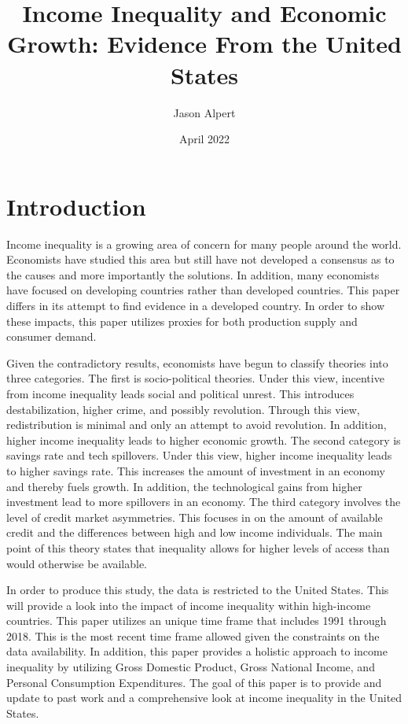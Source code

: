 \documentclass{article}
\title{Income Inequality and Economic Growth: Evidence From the United States}
\author{Jason Alpert }
\date{April 2022}
\begin{document}
\maketitle

\section{Introduction}
\vspace{2mm}

\quad Income inequality is a growing area of concern for many people around the world.  Economists have studied this area but still have not developed a consensus as to the causes and more importantly the solutions.  In addition, many economists have focused on developing countries rather than developed countries.  This paper differs in its attempt to find evidence in a developed country.  In order to show these impacts, this paper utilizes proxies for both production supply and consumer demand.
\vspace{2mm}

\quad Given the contradictory results, economists have begun to classify theories into three categories.  The first is socio-political theories.  Under this view, incentive from income inequality leads social and political unrest.  This introduces destabilization, higher crime, and possibly revolution.  Through this view, redistribution is minimal and only an attempt to avoid revolution. In addition, higher income inequality leads to higher economic growth.  The second category is savings rate and tech spillovers.  Under this view, higher income inequality leads to higher savings rate.  This increases the amount of investment in an economy and thereby fuels growth.  In addition, the technological gains from higher investment lead to more spillovers in an economy.  The third category involves the level of credit market asymmetries.  This focuses in on the amount of available credit and the differences between high and low income individuals.  The main point of this theory states that inequality allows for higher levels of access than would otherwise be available.  
\vspace{2mm}

\quad In order to produce this study, the data is restricted to the United States.  This will provide a look into the impact of income inequality within high-income countries.  This paper utilizes an unique time frame that includes 1991 through 2018.  This is the most recent time frame allowed given the constraints on the data availability. In addition, this paper provides a holistic approach to income inequality by utilizing Gross Domestic Product, Gross National Income, and Personal Consumption Expenditures.  The goal of this paper is to provide and update to past work and a comprehensive look at income inequality in the United States.
\vspace{2mm}
\end{document}

